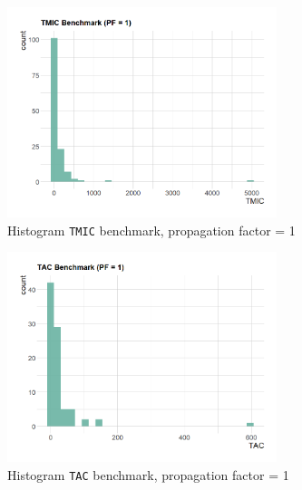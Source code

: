 \begin{figure}[ht!]
\begin{center}
  \includegraphics[width=0.7\textwidth]{figures/benchmark/TMIC_PF_1.png}
  \caption{Histogram \texttt{TMIC} benchmark, propagation factor = 1}
  \label{fig:TMIC-benchmark-1}
\end{center}
\end{figure}

\begin{figure}[ht!]
\begin{center}
\includegraphics[width=0.7\textwidth]{figures/benchmark/TAC_PF_1.png}
\caption{Histogram \texttt{TAC} benchmark, propagation factor = 1}
\label{fig:TAC-benchmark-1}
\end{center}
\end{figure}

